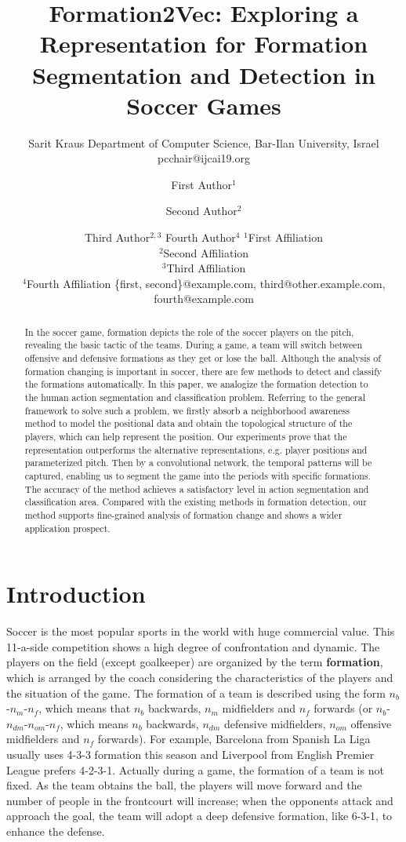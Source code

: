 \documentclass{article}
\title{Formation2Vec: Exploring a Representation for Formation Segmentation and Detection in Soccer Games}
\author{
    Sarit Kraus
    \affiliations
    Department of Computer Science, Bar-Ilan University, Israel \emails
    pcchair@ijcai19.org
}
\author{
First Author$^1$
\and
Second Author$^2$\and
Third Author$^{2,3}$\And
Fourth Author$^4$
\affiliations
$^1$First Affiliation\\
$^2$Second Affiliation\\
$^3$Third Affiliation\\
$^4$Fourth Affiliation
\emails
\{first, second\}@example.com,
third@other.example.com,
fourth@example.com
}
\begin{document}
\maketitle

\begin{abstract}
    In the soccer game, formation depicts the role of the soccer players on the pitch, revealing the basic tactic of the teams. During a game, a team will switch between offensive and defensive formations as they get or lose the ball. Although the analysis of formation changing is important in soccer, there are few methods to detect and classify the formations automatically. In this paper, we analogize the formation detection to the human action segmentation and classification problem. Referring to the general framework to solve such a problem, we firstly absorb a neighborhood awareness method to model the positional data and obtain the topological structure of the players, which can help represent the position. Our experiments prove that the representation outperforms the alternative representations, e.g. player positions and parameterized pitch. Then by a convolutional network, the temporal patterns will be captured, enabling us to segment the game into the periods with specific formations. The accuracy of the method achieves a satisfactory level in action segmentation and classification area. Compared with the existing methods in formation detection, our method supports fine-grained analysis of formation change and shows a wider application prospect.

\end{abstract}

\section{Introduction}

Soccer is the most popular sports in the world with huge commercial value. This 11-a-side competition shows a high degree of confrontation and dynamic. The players on the field (except goalkeeper) are organized by the term {\bf formation}, which is arranged by the coach considering the characteristics of the players and the situation of the game. The formation of a team is described using the form $n_b$-$n_m$-$n_f$, which means that $n_b$ backwards, $n_m$ midfielders and $n_f$ forwards (or $n_b$-$n_{dm}$-$n_{om}$-$n_{f}$, which means $n_b$ backwards, $n_{dm}$ defensive midfielders, $n_{om}$ offensive midfielders and $n_f$ forwards). For example, Barcelona from Spanish La Liga usually uses 4-3-3 formation this season and Liverpool from English Premier League prefers 4-2-3-1. Actually during a game, the formation of a team is not fixed. As the team obtains the ball, the players will move forward and the number of people in the frontcourt will increase; when the opponents attack and approach the goal, the team will adopt a deep defensive formation, like 6-3-1, to enhance the defense. 
\end{document}
